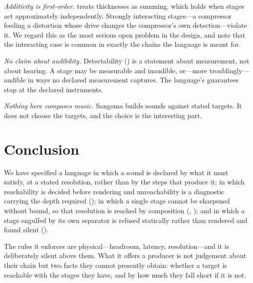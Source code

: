 \documentclass[11pt,twocolumn,a4paper]{article}
\theoremstyle{definition}
\theoremstyle{remark}
\begin{document}
\emph{Additivity is first-order.}  treats thicknesses as
summing, which holds when stages act approximately independently. Strongly
interacting stages---a compressor feeding a distortion whose drive changes the
compressor's own detection---violate it. We regard this as the most serious open
problem in the design, and note that the interacting case is common in exactly
the chains the language is meant for.

\emph{No claim about audibility.} Detectability () is a
statement about measurement, not about hearing. A stage may be measurable and
inaudible, or---more troublingly---audible in ways no declared measurement
captures. The language's guarantees stop at the declared instruments.

\emph{Nothing here composes music.} Sangoma builds sounds against stated targets.
It does not choose the targets, and the choice is the interesting part.

\section{Conclusion}
\label{sec:conclusion}

We have specified a language in which a sound is declared by what it must
satisfy, at a stated resolution, rather than by the steps that produce it; in
which reachability is decided before rendering and unreachability is a diagnostic
carrying the depth required (); in which a single stage cannot
be sharpened without bound, so that resolution is reached by composition
(, ); and in which a stage engulfed by its own
separator is refused statically rather than rendered and found silent
().

The rules it enforces are physical---headroom, latency, resolution---and it is
deliberately silent above them. What it offers a producer is not judgement about
their chain but two facts they cannot presently obtain: whether a target is
reachable with the stages they have, and by how much they fall short if it is
not.



\end{document}
